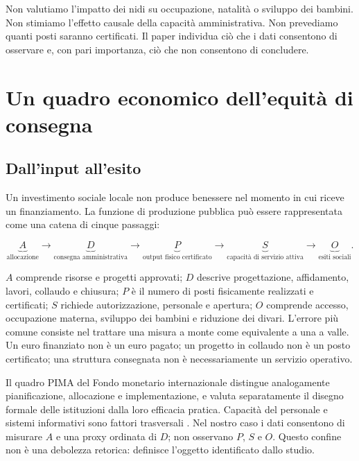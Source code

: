 \documentclass[10pt,a4paper]{article}
\begin{document}
Non valutiamo l'impatto dei nidi su occupazione, natalità o sviluppo dei bambini. Non stimiamo l'effetto causale della capacità amministrativa. Non prevediamo quanti posti saranno certificati. Il paper individua ciò che i dati consentono di osservare e, con pari importanza, ciò che non consentono di concludere.

\section{Un quadro economico dell'equità di consegna}

\subsection{Dall'input all'esito}

Un investimento sociale locale non produce benessere nel momento in cui riceve un finanziamento. La funzione di produzione pubblica può essere rappresentata come una catena di cinque passaggi:

\begin{equation}
  \underbrace{A}_{\text{allocazione}}
  \longrightarrow
  \underbrace{D}_{\text{consegna amministrativa}}
  \longrightarrow
  \underbrace{P}_{\text{output fisico certificato}}
  \longrightarrow
  \underbrace{S}_{\text{capacità di servizio attiva}}
  \longrightarrow
  \underbrace{O}_{\text{esiti sociali}}.
\end{equation}

$A$ comprende risorse e progetti approvati; $D$ descrive progettazione, affidamento, lavori, collaudo e chiusura; $P$ è il numero di posti fisicamente realizzati e certificati; $S$ richiede autorizzazione, personale e apertura; $O$ comprende accesso, occupazione materna, sviluppo dei bambini e riduzione dei divari. L'errore più comune consiste nel trattare una misura a monte come equivalente a una a valle. Un euro finanziato non è un euro pagato; un progetto in collaudo non è un posto certificato; una struttura consegnata non è necessariamente un servizio operativo.

Il quadro PIMA del Fondo monetario internazionale distingue analogamente pianificazione, allocazione e implementazione, e valuta separatamente il disegno formale delle istituzioni dalla loro efficacia pratica. Capacità del personale e sistemi informativi sono fattori trasversali \citep{imf2022}. Nel nostro caso i dati consentono di misurare $A$ e una proxy ordinata di $D$; non osservano $P$, $S$ e $O$. Questo confine non è una debolezza retorica: definisce l'oggetto identificato dallo studio.
\end{document}
